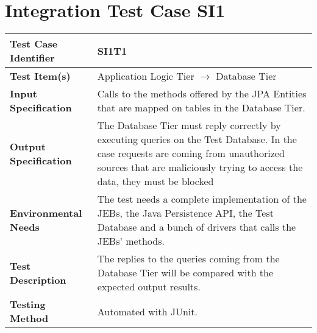 \section{Integration Test Case SI1}

\begin{longtable}{p{} | p{}}
\hline
\textbf{Test Case Identifier} & SI1T1\\
\hline
\textbf{Test Item(s)} & Application Logic Tier $\rightarrow$ Database Tier \\
\hline
\textbf{Input Specification} & Calls to the methods offered by the JPA Entities that are mapped on tables in the Database Tier. \\
\hline
\textbf{Output Specification} & The Database Tier must reply correctly by executing queries on the Test Database. In the case requests are coming from unauthorized sources that are maliciously trying to access the data, they must be blocked\\
\hline
\textbf{Environmental Needs} & The test needs a complete implementation of the JEBs, the Java Persistence API, the Test Database and a bunch of drivers that calls the JEBs' methods. \\
\hline
\textbf{Test Description} & The replies to the queries coming from the Database Tier will be compared with the expected output results. \\
\hline
\textbf{Testing Method} & Automated with JUnit. \\
\hline
\end{longtable}
